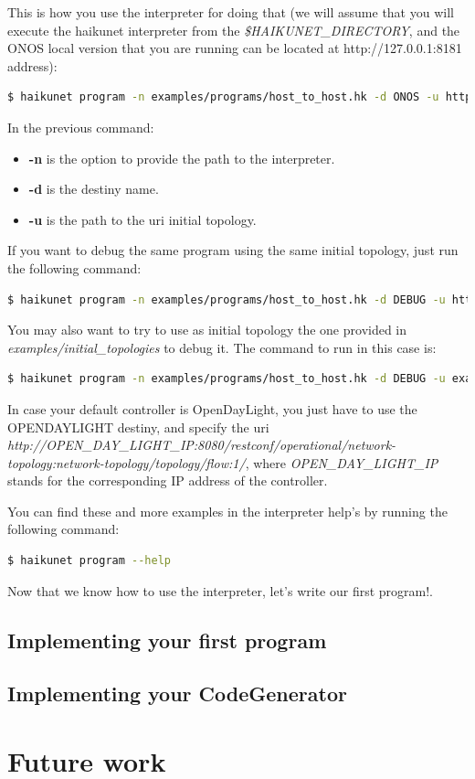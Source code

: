 This is how you use the interpreter for doing that (we will assume that you will execute the haikunet interpreter from the \textit{\$HAIKUNET\_DIRECTORY}, and the ONOS local version that you are running can be located at http://127.0.0.1:8181 address):

\begin{lstlisting}[language=bash,breaklines=true]
$ haikunet program -n examples/programs/host_to_host.hk -d ONOS -u http://127.0.0.1:8181/onos/v1/
\end{lstlisting}

In the previous command:
\begin{itemize}
\item \textbf{-n} is the option to provide the path to the interpreter.
\item \textbf{-d} is the destiny name.
\item \textbf{-u} is the path to the uri initial topology.
\end{itemize}

If you want to debug the same program using the same initial topology, just run the following command:

\begin{lstlisting}[language=bash,breaklines=true]
$ haikunet program -n examples/programs/host_to_host.hk -d DEBUG -u http://127.0.0.1:8181/onos/v1/
\end{lstlisting}

You may also want to try to use as initial topology the one provided in \textit{examples/initial\_topologies} to debug it. The command to run in this case is:

\begin{lstlisting}[language=bash,breaklines=true]
$ haikunet program -n examples/programs/host_to_host.hk -d DEBUG -u examples/initial_topologies/example_topology.rb
\end{lstlisting}

In case your default controller is OpenDayLight, you just have to use the OPENDAYLIGHT destiny, and specify the uri \textit{http://OPEN\_DAY\_LIGHT\_IP:8080/restconf/operational/network-topology:network-topology/topology/flow:1/}, where \textit{OPEN\_DAY\_LIGHT\_IP} stands for the corresponding IP address of the controller. 

You can find these and more examples in the interpreter help's by running the following command:

\begin{lstlisting}[language=bash,breaklines=true]
$ haikunet program --help
\end{lstlisting}

Now that we know how to use the interpreter, let's write our first program!.

\subsection{Implementing your first program}

\subsection{Implementing your CodeGenerator}

\section{Future work}